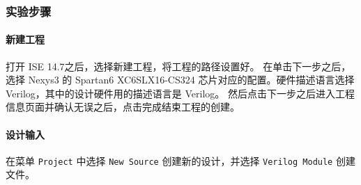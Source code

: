 \documentclass{ctexart}
\begin{document}
            \subsubsection{实验步骤}
            \paragraph{新建工程}
            
            打开 ISE 14.7之后，选择新建工程，将工程的路径设置好。
            在单击下一步之后，选择 Nexys3 的 Spartan6 XC6SLX16-CS324 芯片对应的配置。硬件描述语言选择 Verilog，其中的设计硬件用的描述语言是 Verilog。
            然后点击下一步之后进入工程信息页面并确认无误之后，点击完成结束工程的创建。
            
            \paragraph{设计输入}
            
            在菜单 \verb|Project| 中选择 \verb|New Source| 创建新的设计，并选择 \verb|Verilog Module| 创建文件。
            
\end{document}
